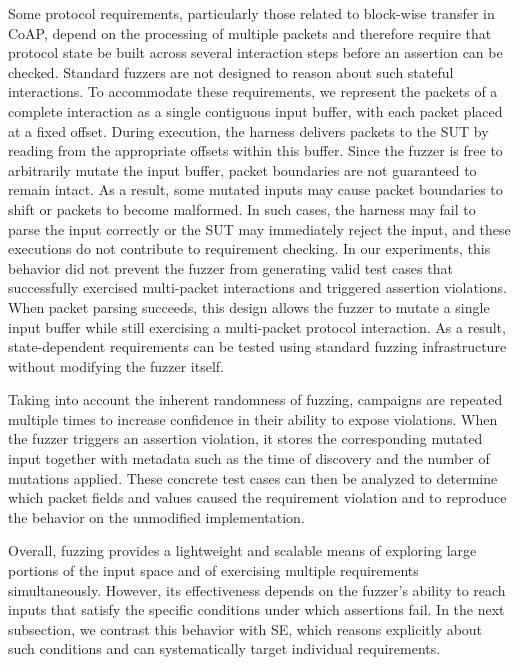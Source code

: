 Some protocol requirements, particularly those related to block-wise transfer in CoAP, depend on the processing of multiple packets and therefore require that protocol state be built across several interaction steps before an assertion can be checked.
Standard fuzzers are not designed to reason about such stateful interactions.
To accommodate these requirements, we represent the packets of a complete interaction as a single contiguous input buffer, with each packet placed at a fixed offset.
During execution, the harness delivers packets to the SUT by reading from the appropriate offsets within this buffer.
Since the fuzzer is free to arbitrarily mutate the input buffer, packet boundaries are not guaranteed to remain intact.
As a result, some mutated inputs may cause packet boundaries to shift or packets to become malformed.
In such cases, the harness may fail to parse the input correctly or the SUT may immediately reject the input, and these executions do not contribute to requirement checking.
In our experiments, this behavior did not prevent the fuzzer from generating valid test cases that successfully exercised multi-packet interactions and triggered assertion violations.
When packet parsing succeeds, this design allows the fuzzer to mutate a single input buffer while still exercising a multi-packet protocol interaction.
As a result, state-dependent requirements can be tested using standard fuzzing infrastructure without modifying the fuzzer itself.

Taking into account the inherent randomness of fuzzing, campaigns are repeated multiple times to increase confidence in their ability to expose violations.
When the fuzzer triggers an assertion violation, it stores the corresponding mutated input together with metadata such as the time of discovery and the number of mutations applied.
These concrete test cases can then be analyzed to determine which packet fields and values caused the requirement violation and to reproduce the behavior on the unmodified implementation.

Overall, fuzzing provides a lightweight and scalable means of exploring large portions of the input space and of exercising multiple requirements simultaneously.
However, its effectiveness depends on the fuzzer's ability to reach inputs that satisfy the specific conditions under which assertions fail.
In the next subsection, we contrast this behavior with SE, which reasons explicitly about such conditions and can systematically target individual requirements.

